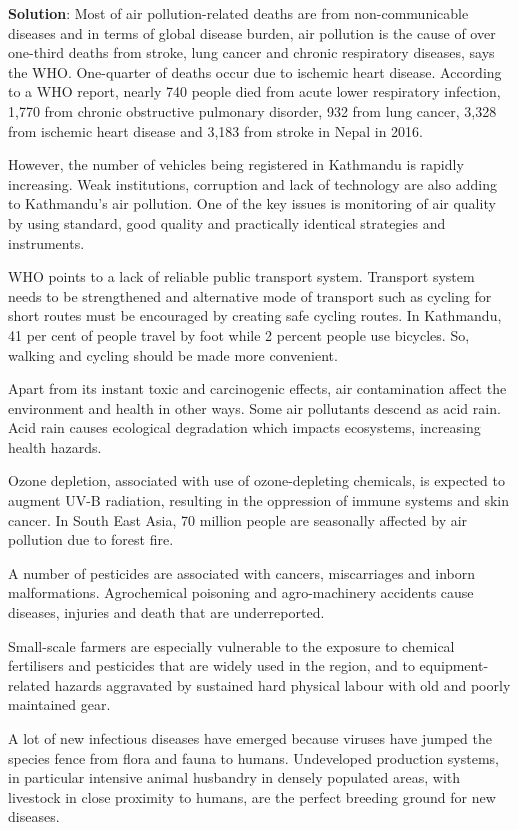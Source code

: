 \documentclass[
]{book}
\newenvironment{solution}{ {\bfseries Solution}:}{}
\begin{document}
\begin{questions}
\begin{solution}
Most of air pollution-related deaths are from non-communicable diseases and in terms of global disease burden, air pollution is the cause of over one-third deaths from stroke, lung cancer and chronic respiratory diseases, says the WHO. One-quarter of deaths occur due to ischemic heart disease. According to a WHO report, nearly 740 people died from acute lower respiratory infection, 1,770 from chronic obstructive pulmonary disorder, 932 from lung cancer, 3,328 from ischemic heart disease and 3,183 from stroke in Nepal in 2016.

However, the number of vehicles being registered in Kathmandu is rapidly increasing. Weak institutions, corruption and lack of technology are also adding to Kathmandu’s air pollution. One of the key issues is monitoring of air quality by using standard, good quality and practically identical strategies and instruments.

WHO points to a lack of reliable public transport system. Transport system needs to be strengthened and alternative mode of transport such as cycling for short routes must be encouraged by creating safe cycling routes. In Kathmandu, 41 per cent of people travel by foot while 2 percent people use bicycles. So, walking and cycling should be made more convenient.

Apart from its instant toxic and carcinogenic effects, air contamination affect the environment and health in other ways. Some air pollutants descend as acid rain. Acid rain causes ecological degradation which impacts ecosystems, increasing health hazards. 

Ozone depletion, associated with use of ozone-depleting chemicals, is expected to augment UV-B radiation, resulting in the oppression of immune systems and skin cancer. In South East Asia, 70 million people are seasonally affected by air pollution due to forest fire.

A number of pesticides are associated with cancers, miscarriages and inborn malformations. Agrochemical poisoning and agro-machinery accidents cause diseases, injuries and death that are underreported.

Small-scale farmers are especially vulnerable to the exposure to chemical fertilisers and pesticides that are widely used in the region, and to equipment-related hazards aggravated by sustained hard physical labour with old and poorly maintained gear.

A lot of new infectious diseases have emerged because viruses have jumped the species fence from flora and fauna to humans. Undeveloped production systems, in particular intensive animal husbandry in densely populated areas, with livestock in close proximity to humans, are the perfect breeding ground for new diseases.


\end{solution}
\end{questions}
\end{document}
